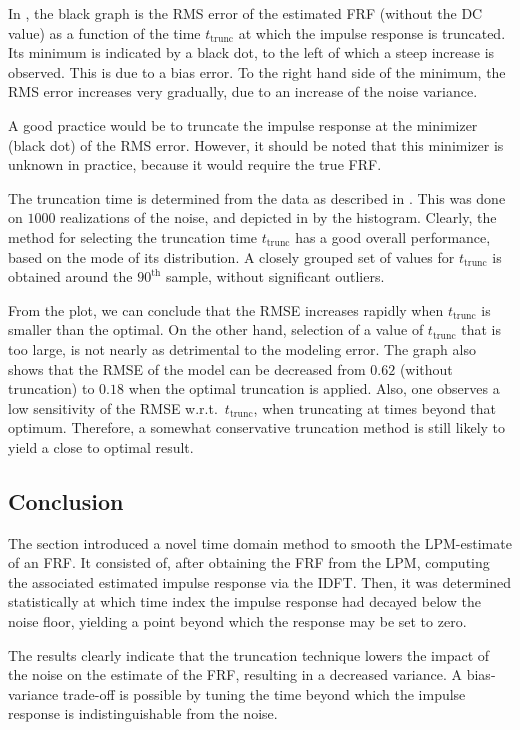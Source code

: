 In , the black graph is the \gls{RMS} error of the estimated \gls{FRF} (without the \gls{DC} value) as a function of the time $t_\mathrm{trunc}$ at which the impulse response is truncated. Its minimum is indicated by a black dot, to the left of which a steep increase is observed. This is due to a bias error. To the right hand side of the minimum, the \gls{RMS} error increases very gradually, due to an increase of the noise variance.

A good practice would be to truncate the impulse response at the minimizer (black dot) of the \gls{RMS} error. However, it should be noted that this minimizer is unknown in practice, because it would require
the true \gls{FRF}.

The truncation time is determined from the data as described in . This was done on $1000$ realizations of the noise, and depicted in  by the histogram.
Clearly, the method for selecting the truncation time $t_{\mathrm{trunc}}$ has a good overall performance, based on the mode of its distribution. A closely grouped set of values for $t_{\mathrm{trunc}}$ is obtained around the $90^{\text{th}}$ sample, without significant outliers.


From the plot, we can conclude that the \gls{RMSE} increases rapidly when $t_{\mathrm{trunc}}$ is smaller than the optimal.
On the other hand, selection of a value of $t_{\mathrm{trunc}}$ that is too large, is not nearly as detrimental to the modeling error.
The graph also shows that the \gls{RMSE} of the model can be decreased from $0.62$ (without truncation) to $0.18$ when the optimal truncation is applied. Also, one observes a low sensitivity of the \gls{RMSE} w.r.t.~$t_\mathrm{trunc}$, when truncating at times beyond that optimum. Therefore, a somewhat conservative truncation method is still likely to yield a close to optimal result.

\subsection{Conclusion}\label{se:conclusion}

The section introduced a novel time domain method to smooth the \gls{LPM}-estimate of an \gls{FRF}. It consisted of, after obtaining the \gls{FRF} from the \gls{LPM}, computing the associated estimated impulse response via the \gls{IDFT}.
Then, it was determined statistically at which time index the impulse response had decayed below the noise floor, yielding a point beyond which the response may be set to zero.

The results clearly indicate that the truncation technique lowers the impact of the noise on the estimate of the \gls{FRF}, resulting in a decreased variance. A bias-variance trade-off is possible by tuning the time beyond which the impulse response is indistinguishable from the noise.

